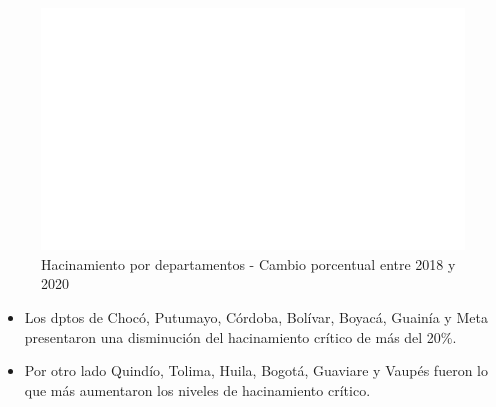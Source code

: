     \begin{figure}[H]
        \caption{Hacinamiento por departamentos - Cambio porcentual entre 2018 y 2020 \label{map_result_2} }
        \begin{center}
        \includegraphics[width=\textwidth,keepaspectratio]{img/var_265_map_change.png}
        \end{center}
    \end{figure}
            \begin{itemize}
                    \item Los dptos de Chocó, Putumayo, Córdoba, Bolívar, Boyacá, Guainía y Meta presentaron una disminución del hacinamiento crítico de más del 20\%.
                    \item Por otro lado Quindío, Tolima, Huila, Bogotá, Guaviare y Vaupés fueron lo que más aumentaron los niveles de hacinamiento crítico.
                    \end{itemize}

